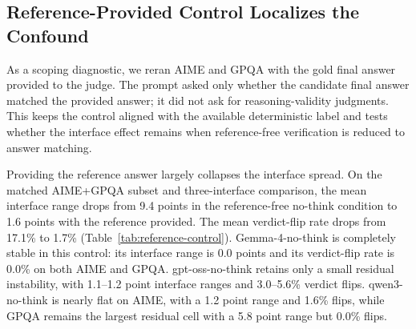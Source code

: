 \documentclass[journal]{IEEEtran}
\begin{document}
\begin{table}[t]
\centering
\footnotesize
\setlength{\tabcolsep}{4pt}
\caption{Coverage audit from constrained-decoding runs. Overflow exclusions are uniform content-driven exclusions. Valid range is the minimum and maximum valid-verdict rate on the analyzable pool across judge-interface cells.}
\label{tab:coverage}
\end{table}

\subsection{Reference-Provided Control Localizes the Confound}
\label{sec:results-reference}

As a scoping diagnostic, we reran AIME and GPQA with the gold final answer provided to the judge. The prompt asked only whether the candidate final answer matched the provided answer; it did not ask for reasoning-validity judgments. This keeps the control aligned with the available deterministic label and tests whether the interface effect remains when reference-free verification is reduced to answer matching.

Providing the reference answer largely collapses the interface spread. On the matched AIME+GPQA subset and three-interface comparison, the mean interface range drops from 9.4 points in the reference-free no-think condition to 1.6 points with the reference provided. The mean verdict-flip rate drops from 17.1\% to 1.7\% (Table~\ref{tab:reference-control}). Gemma-4-no-think is completely stable in this control: its interface range is 0.0 points and its verdict-flip rate is 0.0\% on both AIME and GPQA. gpt-oss-no-think retains only a small residual instability, with 1.1--1.2 point interface ranges and 3.0--5.6\% verdict flips. qwen3-no-think is nearly flat on AIME, with a 1.2 point range and 1.6\% flips, while GPQA remains the largest residual cell with a 5.8 point range but 0.0\% flips.
\end{document}
